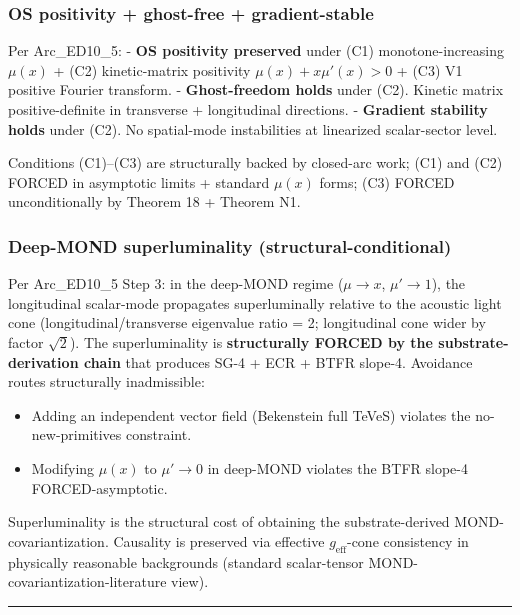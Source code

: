 \documentclass[
  11pt,a4paper]{article}
\providecommand{\tightlist}{%
  \setlength{\itemsep}{0pt}\setlength{\parskip}{0pt}}
\begin{document}
\subsubsection{OS positivity + ghost-free +
gradient-stable}\label{os-positivity-ghost-free-gradient-stable}

Per Arc\_ED10\_5: - \textbf{OS positivity preserved} under (C1)
monotone-increasing \(\mu(x)\) + (C2) kinetic-matrix positivity
\(\mu(x) + x\mu'(x) > 0\) + (C3) V1 positive Fourier transform. -
\textbf{Ghost-freedom holds} under (C2). Kinetic matrix
positive-definite in transverse + longitudinal directions. -
\textbf{Gradient stability holds} under (C2). No spatial-mode
instabilities at linearized scalar-sector level.

Conditions (C1)--(C3) are structurally backed by closed-arc work; (C1)
and (C2) FORCED in asymptotic limits + standard \(\mu(x)\) forms; (C3)
FORCED unconditionally by Theorem 18 + Theorem N1.

\subsubsection{Deep-MOND superluminality
(structural-conditional)}\label{deep-mond-superluminality-structural-conditional}

Per Arc\_ED10\_5 Step 3: in the deep-MOND regime (\(\mu \to x\),
\(\mu' \to 1\)), the longitudinal scalar-mode propagates superluminally
relative to the acoustic light cone (longitudinal/transverse eigenvalue
ratio = 2; longitudinal cone wider by factor \(\sqrt{2}\)). The
superluminality is \textbf{structurally FORCED by the
substrate-derivation chain} that produces SG-4 + ECR + BTFR slope-4.
Avoidance routes structurally inadmissible:

\begin{itemize}
\tightlist
\item
  Adding an independent vector field (Bekenstein full TeVeS) violates
  the no-new-primitives constraint.
\item
  Modifying \(\mu(x)\) to \(\mu' \to 0\) in deep-MOND violates the BTFR
  slope-4 FORCED-asymptotic.
\end{itemize}

Superluminality is the structural cost of obtaining the
substrate-derived MOND-covariantization. Causality is preserved via
effective \(g_\mathrm{eff}\)-cone consistency in physically reasonable
backgrounds (standard scalar-tensor MOND-covariantization-literature
view).

\begin{center}\rule{0.5\linewidth}{0.5pt}\end{center}
\end{document}
